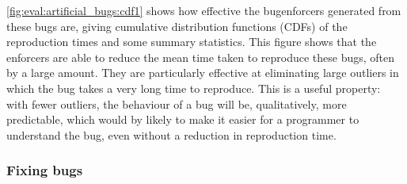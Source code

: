 \autoref{fig:eval:artificial_bugs:cdf1} shows how effective the
\glspl{bugenforcer} generated from these bugs are, giving cumulative
distribution functions (CDFs) of the reproduction times and some
summary statistics.  This figure shows that the enforcers are able to
reduce the mean time taken to reproduce these bugs, often by a large
amount.  They are particularly effective at eliminating large outliers
in which the bug takes a very long time to reproduce.  This is a
useful property: with fewer outliers, the behaviour of a bug will be,
qualitatively, more predictable, which would by likely to make it
easier for a programmer to understand the bug, even without a
reduction in reproduction time.

\subsubsection{Fixing bugs}

